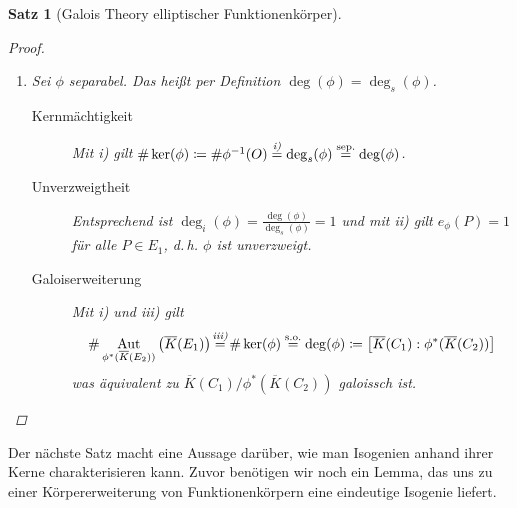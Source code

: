 \documentclass[english, german, parskip=half]{scrartcl}
\newtheorem{Satz}{Satz}[section]
\theoremstyle{definition}
\theoremstyle{remark}
\newcommand*{\algK}{\ensuremath{\overline K}} %
\newcommand*{\degs}{\operatorname{\deg}_s} %
\newcommand*{\degi}{\operatorname{\deg}_i} %
\DeclareMathOperator{\Aut}{Aut} %
\begin{document}
\begin{Satz}[Galois Theory elliptischer Funktionenkörper]
\begin{proof}
\begin{enumerate}[label=\roman*)]
\begin{description}
          die stark von den Koordinaten von $T$ und $O$ abhängen,
          geht hervor, dass dann bereits die Koordinaten von
          $T$ und $O$ übereinstimmen müssen. Damit muss $T=O$ sein.
        \end{description}
    \item Sei $\phi$ separabel. Das heißt per Definition
      $\deg(\phi)=\degs(\phi)$.
      \begin{description}
        \item[Kernmächtigkeit]
          Mit \emph{i)} gilt
          $
          \#\ker(\phi)
          \coloneqq \#\phi^{-1}(O)
          \overset{\mathclap{\emph{i)}}}{=} \degs(\phi)
          \overset{{\text{sep.}}}{=} \deg(\phi)
          $.
        \item[Unverzweigtheit] 
          Entsprechend ist
          $\degi(\phi)=\frac{\deg(\phi)}{\degs(\phi)}=1$
          und mit \emph{ii)} gilt
          $e_\phi(P)=1$ für alle $P\in E_1$, d.\,h. $\phi$
          ist unverzweigt.
        \item[Galoiserweiterung]
          Mit \emph{i)} und \emph{iii)} gilt
          \begin{align*}
            \#\Aut_{\phi^*(\algK(E_2))}\left( \algK(E_1) \right) 
            \overset{\mathclap{\text{\emph{iii)}}}}{=}
              \#\ker(\phi)
            \overset{{\text{s.o.}}}{=} \deg(\phi)
            \coloneqq \left[\algK(C_1):\phi^*(\algK(C_2))\right]
          \end{align*}
          was äquivalent zu
          $\algK(C_1)/\phi^*(\algK(C_2))$ galoissch ist.
        \end{description}
      \end{enumerate}
\end{proof}
\end{Satz}

Der nächste Satz macht eine Aussage darüber, wie man Isogenien anhand
ihrer Kerne charakterisieren kann.
Zuvor benötigen wir noch ein Lemma, das uns zu einer Körpererweiterung
von Funktionenkörpern eine eindeutige Isogenie liefert.
\end{document}
